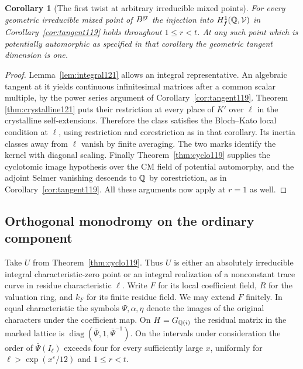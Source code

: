 \documentclass[a4paper,11pt]{article}
\newtheorem{corollary}[proposition]{Corollary}
\theoremstyle{definition}
\theoremstyle{remark}
\numberwithin{equation}{section}
\begin{document}
\begin{corollary}[The first twist at arbitrary irreducible mixed points]
\label{cor:tangent121}
For every geometric irreducible mixed point of \(B^{\rm gr}\)
the injection into \(H_f^1(\mathbb Q,\mathcal V)\) in
Corollary~\ref{cor:tangent119} holds throughout \(1\le r<t\).
At any such point which is potentially automorphic as specified
in that corollary the geometric tangent dimension is one.
\end{corollary}
\begin{proof}
Lemma~\ref{lem:integral121} allows an integral representative.
An algebraic tangent at it yields continuous infinitesimal
matrices after a common scalar multiple, by the power series
argument of Corollary~\ref{cor:tangent119}. Theorem
\ref{thm:crystalline121} puts their restriction at every
place of \(K'\) over \(\ell\) in the crystalline self-extensions.
Therefore the class satisfies the Bloch--Kato local condition
at \(\ell\), using restriction and corestriction as in that
corollary. Its inertia classes away from \(\ell\) vanish by
finite averaging. The two marks identify the kernel with
diagonal scaling. Finally Theorem~\ref{thm:cyclo119} supplies
the cyclotomic image hypothesis over the CM field of potential
automorphy, and the adjoint Selmer vanishing descends to
\(\mathbb Q\) by corestriction, as in
Corollary~\ref{cor:tangent119}. All these arguments now apply
at \(r=1\) as well.
\end{proof}

\subsection{Orthogonal monodromy on the ordinary component}\label{nav:IV-22}
\label{sec:ordinaryorth122}

Take \(U\) from Theorem~\ref{thm:cyclo119}. Thus \(U\) is either
an absolutely irreducible integral characteristic-zero point or
an integral realization of a nonconstant trace curve in residue
characteristic \(\ell\). Write \(F\) for its local coefficient
field, \(R\) for the valuation ring, and \(k_F\) for its finite
residue field. We may extend \(F\) finitely. In equal
characteristic the symbols \(\Psi,\alpha,\eta\) denote the
images of the original characters under the coefficient map.
On \(H=G_{\mathbb Q(i)}\) the residual matrix in the marked lattice
is \(\operatorname{diag}(\bar\Psi,1,\bar\Psi^{-1})\).
On the intervals under consideration the order of
\(\bar\Psi(I_\ell)\) exceeds four for every sufficiently large
\(x\), uniformly for \(\ell>\exp(x^\varepsilon/12)\) and
\(1\le r<t\).
\end{document}
